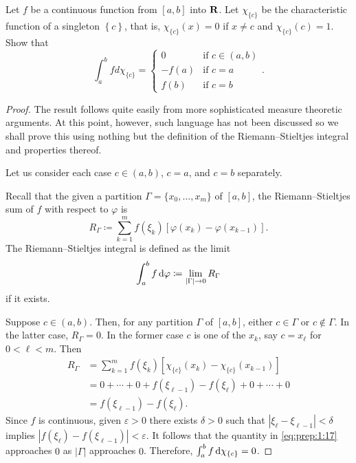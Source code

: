 \begin{problem}
Let $f$ be a continuous function from $[a,b]$ into $\mathbf{R}$. Let
$\chi_{\{c\}}$ be the characteristic function of a singleton
$\left\{c\right\}$, that is, $\chi_{\{c\}}(x)=0$ if $x\neq c$ and
$\chi_{\{c\}}(c)=1$. Show that
\[
\int_a^b f d \chi_{\{c\}}=
\begin{cases}
0&\text{if $c\in(a,b)$}\\
-f(a)&\text{if $c=a$}\\
f(b)&\text{if $c=b$}
\end{cases}.
\]
\end{problem}
\begin{proof}
The result follows quite easily from more sophisticated measure theoretic
arguments. At this point, however, such language has not been discussed so
we shall prove this using nothing but the definition of the
Riemann--Stieltjes integral and properties thereof.

Let us consider each case $c\in(a,b)$, $c=a$, and $c=b$ separately.

Recall that the given a partition $\Gamma=\{x_0,\dotsc,x_m\}$ of $[a,b]$,
the Riemann--Stieltjes sum of $f$ with respect to $\varphi$ is
\begin{equation}
  \label{eq:prep:1:15}
R_\Gamma\coloneqq\sum_{k=1}^mf(\xi_k)[\varphi(x_k)-\varphi(x_{k-1})].
\end{equation}
The Riemann--Stieltjes integral is defined as the limit
\begin{equation}
\label{eq:prep:1:16}
\int_a^b f\mathop{}\!\mathrm{d}\varphi\coloneqq\lim_{|\Gamma|\to 0} R_\Gamma
\end{equation}
if it exists.

Suppose $c\in(a,b)$. Then, for any partition $\Gamma$ of $[a,b]$, either
$c\in\Gamma$ or $c\notin\Gamma$. In the latter case, $R_\Gamma=0$. In the
former case $c$ is one of the $x_k$, say $c=x_\ell$ for $0<\ell<m$. Then
\begin{equation}
\label{eq:prep:1:17}
\begin{aligned}
R_\Gamma&=\sum_{k=1}^mf(\xi_k)[\chi_{\{c\}}(x_k)-\chi_{\{c\}}(x_{k-1})]\\
&=0+\dotsb+0+f(\xi_{\ell-1})-f(\xi_\ell)+0+\dotsb+0\\
&=f(\xi_{\ell-1})-f(\xi_\ell).
\end{aligned}
\end{equation}
Since $f$ is continuous, given $\varepsilon>0$ there exists $\delta>0$ such
that $|\xi_\ell-\xi_{\ell-1}|<\delta$ implies
$|f(\xi_{\ell})-f(\xi_{\ell-1})|<\varepsilon$. It follows that the quantity
in \eqref{eq:prep:1:17} approaches $0$ as $|\Gamma|$ approaches
$0$. Therefore, $\int_a^b f\mathop{}\!\mathrm{d}\chi_{\{c\}}=0$.


\end{proof}
